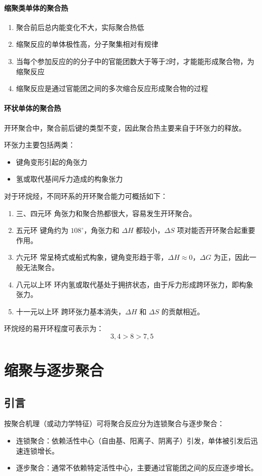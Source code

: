 ﻿\documentclass[12pt,a4paper]{article}
\begin{document}
\paragraph{缩聚类单体的聚合热}
\begin{enumerate}[ 1)]
\item {聚合前后总内能变化不大，实际聚合热低}
\item {缩聚反应的单体极性高，分子聚集相对有规律}
\item 当每个参加反应的的分子中的官能团数大于等于2时，才能能形成聚合物，为缩聚反应
\item 缩聚反应是通过官能团之间的多次缩合反应形成聚合物的过程
\end{enumerate}
\paragraph{环状单体的聚合热}

开环聚合中，聚合前后键的类型不变，因此聚合热主要来自于环张力的释放。

环张力主要包括两类：
\begin{itemize}
    \item 键角变形引起的角张力
    \item 氢或取代基间斥力造成的构象张力
\end{itemize}

对于环烷烃，不同环系的开环聚合能力可概括如下：
\begin{enumerate}[1)]
    \item 三、四元环
    \subitem 角张力和聚合热都很大，容易发生开环聚合。
    \item 五元环
    \subitem 键角约为 $108^\circ$，角张力和 $\Delta H$ 都较小，$\Delta S$ 项对能否开环聚合起重要作用。
    \item 六元环
    \subitem 常呈椅式或船式构象，键角变形趋于零，$\Delta H \approx 0$，$\Delta G$ 为正，因此一般无法聚合。
    \item 八元以上环
    \subitem 环内氢或取代基处于拥挤状态，由于斥力形成跨环张力，即构象张力。
    \item 十一元以上环
    \subitem 跨环张力基本消失，$\Delta H$ 和 $\Delta S$ 的贡献相近。
\end{enumerate}

环烷烃的易开环程度可表示为：
\[
3,4 > 8 > 7,5
\]
\newpage
\section{缩聚与逐步聚合}
\subsection{引言}
按聚合机理（或动力学特征）可将聚合反应分为连锁聚合与逐步聚合：
\begin{itemize}
  \item 连锁聚合：依赖活性中心（自由基、阳离子、阴离子）引发，单体被引发后迅速连锁增长。
  \item 逐步聚合：通常不依赖特定活性中心，主要通过官能团之间的反应逐步增长。
\end{itemize}
\end{document}
